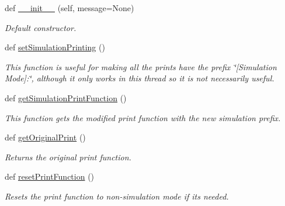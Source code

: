 \begin{DoxyCompactItemize}
\item 
def \hyperlink{classMoteusException_1_1MoteusWarning_aaf4c8f17344919a22170e3866fbef9e4}{\+\_\+\+\_\+init\+\_\+\+\_\+} (self, message=None)
\begin{DoxyCompactList}\small\item\em Default constructor. \end{DoxyCompactList}\item 
\mbox{\label{classMoteusException_1_1MoteusWarning_af68079f6f69c3ea6d96d35104493621b}} 
def \hyperlink{classMoteusException_1_1MoteusWarning_af68079f6f69c3ea6d96d35104493621b}{set\+Simulation\+Printing} ()
\begin{DoxyCompactList}\small\item\em This function is useful for making all the prints have the prefix \char`\"{}\mbox{[}\+Simulation Mode\mbox{]}\+:\char`\"{}, although it only works in this thread so it is not necessarily useful. \end{DoxyCompactList}\item 
def \hyperlink{classMoteusException_1_1MoteusWarning_af50b0a168529c9856e982fb6f5f314ee}{get\+Simulation\+Print\+Function} ()
\begin{DoxyCompactList}\small\item\em This function gets the modified print function with the new simulation prefix. \end{DoxyCompactList}\item 
def \hyperlink{classMoteusException_1_1MoteusWarning_aac19a61457cd87b430e92392c5ce1c04}{get\+Original\+Print} ()
\begin{DoxyCompactList}\small\item\em Returns the original print function. \end{DoxyCompactList}\item 
\mbox{\label{classMoteusException_1_1MoteusWarning_a4605b52a345e8ab33741981e51f36492}} 
def \hyperlink{classMoteusException_1_1MoteusWarning_a4605b52a345e8ab33741981e51f36492}{reset\+Print\+Function} ()
\begin{DoxyCompactList}\small\item\em Resets the print function to non-\/simulation mode if its needed. \end{DoxyCompactList}\end{DoxyCompactItemize}
